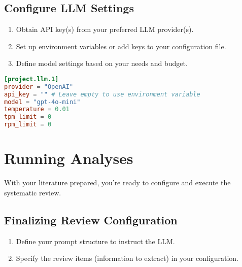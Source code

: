 
\subsection{Configure LLM Settings}

\begin{enumerate}
    \item Obtain API key(s) from your preferred LLM provider(s).
    \item Set up environment variables or add keys to your configuration file.
    \item Define model settings based on your needs and budget.
\end{enumerate}

\begin{configbox}
\begin{lstlisting}[language=TOML]
[project.llm.1]
provider = "OpenAI"
api_key = "" # Leave empty to use environment variable
model = "gpt-4o-mini"
temperature = 0.01
tpm_limit = 0
rpm_limit = 0
\end{lstlisting}
\end{configbox}


\section{Running Analyses}

With your literature prepared, you're ready to configure and execute the systematic review.

\subsection{Finalizing Review Configuration}

\begin{enumerate}
    \item Define your prompt structure to instruct the LLM.
    \item Specify the review items (information to extract) in your configuration.
\end{enumerate}

